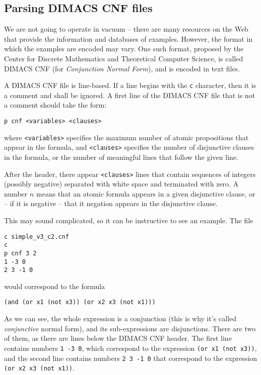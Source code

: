 \subsection{Parsing DIMACS CNF files}

We are not going to operate in vacuum -- there are many
resources on the Web that provide the information and databases
of examples. However, the format in which the examples are
encoded may vary. One such format, proposed by the Center
for Discrete Mathematics and Theoretical Computer Science,
is called DIMACS CNF (for \textit{Conjunction Normal Form}),
and is encoded in text files.

A DIMACS CNF file is line-based. If a line begins with the \texttt{c}
character, then it is a comment and shall be ignored. A first
line of the DIMACS CNF file that is not a comment should take the
form:

\texttt{p cnf <variables> <clauses>}

where \texttt{<variables>} specifies the maximum number of atomic
propositions that appear in the formula, and \texttt{<clauses>}
specifies the number of disjunctive clauses in the formula, or
the number of meaningful lines that follow the given line.

After the header, there appear \texttt{<clauses>} lines that
contain sequences of integers (possibly negative) separated with
white space and terminated with zero. A number $n$ means that
an atomic formula appears in a given disjunctive clause,
or -- if it is negative -- that it negation appears in the
disjunctive clause.

This may sound complicated, so it can be instructive to see
an example. The file

\begin{Verbatim}[samepage=true]
c simple_v3_c2.cnf
c
p cnf 3 2
1 -3 0
2 3 -1 0
\end{Verbatim}

would correspond to the formula 

\texttt{(and (or x1 (not x3)) (or x2 x3 (not x1)))}

As we can see, the whole expression is a conjunction (this is
why it's called \textit{conjunctive} normal form), and its
sub-expressions are disjunctions. There are two of them,
as there are lines below the DIMACS CNF header. The first
line contains numbers \texttt{1 -3 0}, which correspond
to the expression \texttt{(or x1 (not x3))}, and the second
line contains numbers \texttt{2 3 -1 0} that correspond to
the expression \texttt{(or x2 x3 (not x1))}.

